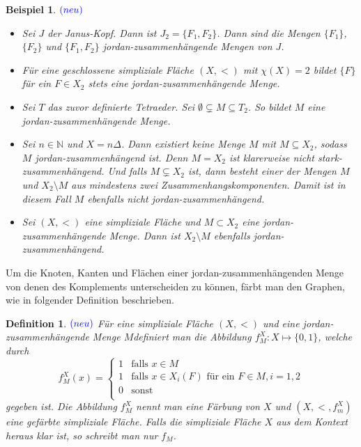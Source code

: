 \documentclass[12pt,titlepage]{article}
\newtheorem{bsp}{Beispiel}[section]
\newtheorem{definition}{Definition}[section]
\begin{document}
\begin{bsp}$\textcolor{blue}{(neu)}$
\begin{itemize}
\item Sei $J$ der Janus-Kopf. Dann ist $J_2=\{F_1,F_2\}$. Dann sind die Mengen $\{F_1\}$,$\{F_2\}$ und $\{F_1,F_2\}$ jordan-zusammenhängende Mengen von $J$.
\item Für eine geschlossene simpliziale Fläche $(X,<)$ mit $\chi(X)=2$ bildet $\{F\}$ für ein $F \in X_2$ stets eine jordan-zusammenhängende Menge.
\item Sei $T$ das zuvor definierte Tetraeder. Sei $\emptyset \subsetneq M \subseteq T_2$. So bildet $M$ eine jordan-zusammenhängende Menge.
\item Sei $n\in \mathbb{N}$ und $X=n \Delta$. Dann existiert keine Menge $M$ mit $M \subseteq X_2$, sodass $M$ jordan-zusammenhängend ist. Denn $ M = X_2$ ist klarerweise nicht stark-zusammenhängend. Und falls $M \subsetneq X_2$ ist, dann besteht einer der Mengen $M$ und $X_2\setminus M$ aus mindestens zwei Zusammenhangskomponenten. Damit ist in diesem Fall $M$ ebenfalls nicht jordan-zusammenhängend.
\item Sei $(X,<)$ eine simpliziale Fläche und $M \subset X_2$ eine jordan-zusammenhängende Menge. Dann ist $X_2\setminus M$ ebenfalls jordan-zusammenhängend.
\end{itemize}
\end{bsp}
Um die Knoten, Kanten und Flächen einer jordan-zusammenhängenden Menge von denen des Komplements unterscheiden zu können, färbt man den Graphen, wie in folgender Definition beschrieben.

\begin{definition}$\textcolor{blue}{(neu)}$
Für eine simpliziale Fläche $(X,<)$ und eine jordan-zusammenhängende Menge $M$definiert man die Abbildung $f_M^X:X \mapsto\{0,1\}$, welche durch
\[
f^X_M(x)=\begin{cases}
1 & \text{falls } x\in M\\
1 & \text{falls } x \in X_i(F) \text{ für ein }F \in M ,i=1,2\\
0 &\text{sonst}\\

\end{cases}
\]
gegeben ist.
Die Abbildung $f_M^X$ nennt man eine \emph{Färbung} von $X$ und $(X,<,f_m^X)$ eine gefärbte simpliziale Fläche. Falls die simpliziale Fläche $X$ aus dem Kontext heraus klar ist, so schreibt man nur $f_M$.
\end{definition}
\end{document}
